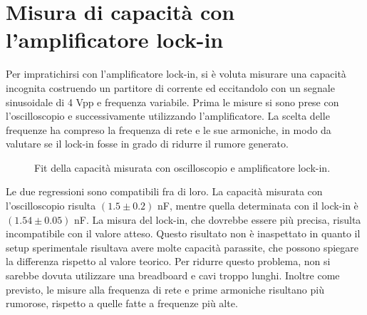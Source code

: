 \documentclass[11pt]{article} %
\begin{document}
\section{Misura di capacità con l'amplificatore lock-in}
Per impratichirsi con l'amplificatore lock-in, si è voluta misurare una capacità incognita costruendo un partitore di corrente ed eccitandolo con un segnale sinusoidale di 4 Vpp e frequenza variabile. Prima le misure si sono prese con l'oscilloscopio e successivamente utilizzando l'amplificatore. La scelta delle frequenze ha compreso la frequenza di rete e le sue armoniche, in modo da valutare se il lock-in fosse in grado di ridurre il rumore generato.
\begin{figure}[!h]
\centering
\caption{Fit della capacità misurata con oscilloscopio e amplificatore lock-in.}
\end{figure}
Le due regressioni sono compatibili fra di loro. La capacità misurata con l'oscilloscopio risulta $\left(1.5\pm0.2\right)$ nF, mentre quella determinata con il lock-in è $\left(1.54\pm0.05\right)$ nF. La misura del lock-in, che dovrebbe essere più precisa, risulta incompatibile con il valore atteso. Questo risultato non è inaspettato in quanto il setup sperimentale risultava avere molte capacità parassite, che possono spiegare la differenza rispetto al valore teorico. Per ridurre questo problema, non si sarebbe dovuta utilizzare una breadboard e cavi troppo lunghi. Inoltre come previsto, le misure alla frequenza di rete e prime armoniche risultano più rumorose, rispetto a quelle fatte a frequenze più alte.
\end{document}
